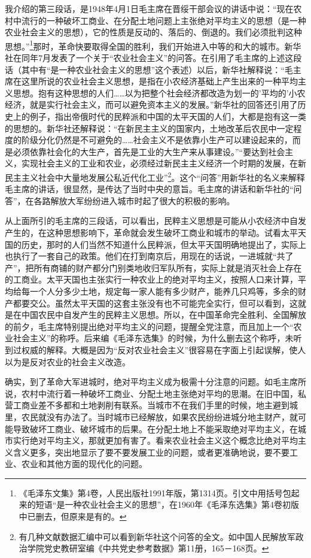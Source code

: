 \documentclass[UTF8, 12pt, a4paper]{ctexrep}
\begin{document}
我介绍的第三段话，是1948年4月1日毛主席在晋绥干部会议的讲话中说：“现在农村中流行的一种破坏工商业、在分配土地问题上主张绝对平均主义的思想（是一种农业社会主义的思想），它的性质是反动的、落后的、倒退的。我们必须批判这种思想。”\footnote{《毛泽东文集》第4卷，人民出版社1991年版，第1314页。引文中用括号包起来的短语“是一种农业社会主义的思想”，在1960年《毛泽东选集》第4卷初版中已删去，但原来是有的。}那时，革命快要取得全国的胜利，我们开始进入中等的和大的城市。新华社在同年7月发表了一个关于“农业社会主义”的问答。在引用了毛主席的上述这段话（其中有“是一种农业社会主义的思想”这个表述）以后，新华社解释说：“毛主席在这里所说的农业社会主义思想，是指在小农经济基础上产生出来的一种平均主义思想。抱有这种思想的人们……以为把整个社会经济都改造为划一的'平均的'小农经济，就是实行社会主义，而可以避免资本主义的发展。”新华社的回答还引用了历史上的例子，指出帝俄时代的民粹派和中国的太平天国的人们，大都是抱有这一类的思想的。新华社还解释说：“在新民主主义的国家内，土地改革后农民中一定程度的阶级分化仍然是不可避免的……社会主义不是依靠小生产可以建设起来的，而是必须依靠社会化的大生产，首先是工业的大生产来从事建设。”“要达到社会主义，实现社会主义的工业和农业，必须经过新民主主义经济一个时期的发展，在新民主主义社会中大量地发展公私近代化工业”\footnote{有几种文献数据汇编中可以看到新华社这个问答的全文。如中国人民解放军政治学院党史教研室编《中共党史参考数据》第11册，165－168页。}。这个“问答”用新华社的名义来解释毛主席的讲话，很显然，是传达了当时中央的意旨。毛主席的讲话和新华社的“问答”，在各路解放大军纷纷进入城市时起了很大的积极的影响。

从上面所引的毛主席的三段话，可以看出，民粹主义思想是可能从小农经济中自发产生的，在这种思想影响下，革命就会发生破坏工商业和城市的举动。试看太平天国的历史，那时的人们当然不知道什么民粹派，但太平天国明确地提出了，实际上也执行了一套自己的政策。他们在打到南京后，用现在的话说，一进城就“共了产”，把所有商铺的财产都分门别类地收归军队所有，实际上就是消灭社会上存在的工商业。太平天国也主张实行一种农业上的绝对平均主义，按照人口来计算，平均给每一个人分多少土地，规定每一家人能有多少财产，能养几只鸡等，多余的财产都要交公。虽然太平天国的这套主张没有也不可能完全实行，但可以看到，这就是在中国农民中自发产生的民粹主义思想。所以，在中国革命完全胜利、全国解放的前夕，毛主席特别提出绝对平均主义的问题，提醒全党注意，而且加上一个“农业社会主义”的称呼。后来编《毛泽东选集》的时候，为什么删去这个称呼，未听到过权威的解释。大概是因为“反对农业社会主义”很容易在字面上引起误解，使人以为是反对农业的社会主义改造。

确实，到了革命大军进城时，绝对平均主义成为极需十分注意的问题。如毛主席所说，农村中流行着一种破坏工商业、分配土地主张绝对平均的思潮。在旧中国，私营工商业差不多都和土地剥削有联系。当城市不在我们手里的时候，地主避到城里，农民就没有办法了。当时城市已经解放，如果农民纷纷进城分地主财产，就可能导致破坏工商业、破坏城市的后果。在分配土地上不能采取绝对平均主义，在城市实行绝对平均主义，那就更加有害了。看来农业社会主义这个概念比绝对平均主义含义更多，突出地显示了要不要发展工业的问题，或者更准确地说，要不要工业、农业和其他方面的现代化的问题。
\end{document}
